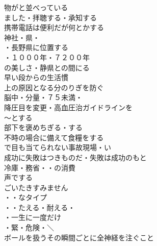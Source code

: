 \begin{multicols}{2}
物がと並べっている\\
ました・拝聴する・承知する\\
携帯電話は便利だが何とかする\\

神社・県・\\
・長野県に位置する\\
・１０００年・７２００年\\
の美しさ・静県との間にる\\

早い段からの生活慣\\
上の原因となる分のりぎを防ぐ\\
脳中・分量・７５未満・\\
降圧目を変更・高血圧治ガイドラインを\\

〜とする\\
部下を褒めちぎる・する\\
不時の場合に備えて食糧をする\\
で目も当てられない事故現場・い\\
成功に失敗はつきものだ・失敗は成功のもと\\
冷庫・務省・・の消費\\

声でする\\
ごいたきすみません\\
・・なタイプ\\
・・たえる・耐える・\\

・一生に一度だけ\\
・緊・危険・＼\\
ボールを扱うその瞬間ごとに全神経を注ぐこと\\

\end{multicols}

